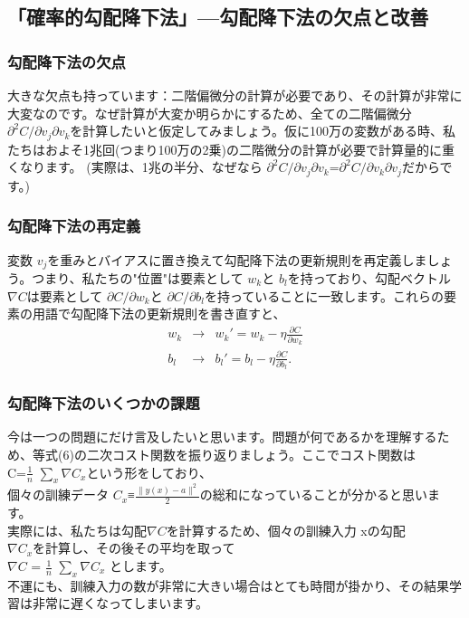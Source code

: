 \documentclass[11pt,a4paper,fleqn]{jsarticle}
\begin{document}
\subsection{「確率的勾配降下法」---勾配降下法の欠点と改善}
\subsubsection{勾配降下法の欠点}
大きな欠点も持っています：二階偏微分の計算が必要であり、その計算が非常に大変なのです。なぜ計算が大変か明らかにするため、全ての二階偏微分 $\partial^2 C/\partial v_j \partial v_k$を計算したいと仮定してみましょう。仮に100万の変数がある時、私たちはおよそ1兆回(つまり100万の2乗)の二階微分の計算が必要で計算量的に重くなります。
(実際は、1兆の半分、なぜなら $\partial^2 C/\partial v_j\partial v_k$=$\partial^2 C/\partial v_k\partial v_j$だからです。)\\
\subsubsection{勾配降下法の再定義}
変数 $v_j$を重みとバイアスに置き換えて勾配降下法の更新規則を再定義しましょう。つまり、私たちの"位置"は要素として $w_k$と $b_l$を持っており、勾配ベクトル $\nabla C$は要素として $\partial C/\partial w_k$と
$\partial C/\partial b_l$を持っていることに一致します。これらの要素の用語で勾配降下法の更新規則を書き直すと、
\begin{eqnarray}
  w_k & \rightarrow & w_k' = w_k-\eta \frac{\partial C}{\partial w_k} \\
  b_l & \rightarrow & b_l' = b_l-\eta \frac{\partial C}{\partial b_l}.
\end{eqnarray}
\subsubsection{勾配降下法のいくつかの課題}
今は一つの問題にだけ言及したいと思います。問題が何であるかを理解するため、等式(6)の二次コスト関数を振り返りましょう。ここでコスト関数は \\
C=$\frac{1}{n}$ $\sum_x \nabla C_x$という形をしており、\\
個々の訓練データ $C_x$≡$\frac{\|y(x)−a\|^2}{2}$の総和になっていることが分かると思います。\\
実際には、私たちは勾配$\nabla C$を計算するため、個々の訓練入力 xの勾配\\
$\nabla C_x$を計算し、その後その平均を取って  \\
$\nabla C$ = $\frac{1}{n} $ $\sum_x \nabla C_x$ とします。\\
不運にも、訓練入力の数が非常に大きい場合はとても時間が掛かり、その結果学習は非常に遅くなってしまいます。
\end{document}
